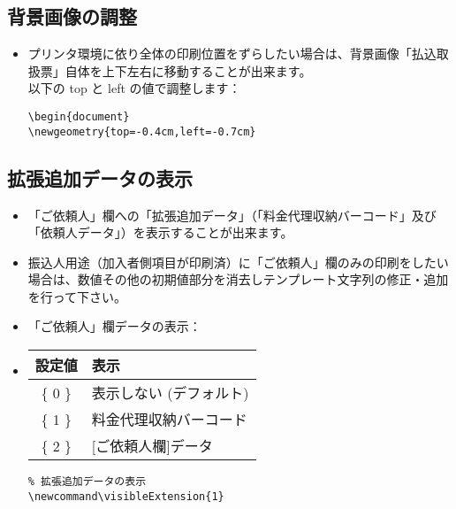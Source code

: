 \documentclass[a4paper,10pt,titlepage]{ltjsarticle}
\def\colH#1{\color[HTML]{#1}}
\newcommand\visibleExtension{1}
\begin{document}
\subsection{背景画像の調整}
\begin{itemize}
  \item プリンタ環境に依り全体の印刷位置をずらしたい場合は、背景画像「払込取扱票」自体を上下左右に移動することが出来ます。\\
以下の {\colH{800000} top} と {\colH{800000} left} の値で調整します：
\begin{verbatim}
\begin{document}
\newgeometry{top=-0.4cm,left=-0.7cm}
\end{verbatim}
  
\end{itemize}

\subsection{拡張追加データの表示}

\begin{itemize}
   \item 「ご依頼人」欄への「拡張追加データ」（「料金代理収納バーコード」及び「依頼人データ」）を表示することが出来ます。   
   \item 振込人用途（加入者側項目が印刷済）に「ご依頼人」欄のみの印刷をしたい場合は、数値その他の初期値部分を消去しテンプレート文字列の修正・追加を行って下さい。
   \item 「ご依頼人」欄データの表示：
   \item[] 
\vspace{2mm}
\begin{tabular}{|c|l|}
\hline
\bfseries{設定値} & \hspace{40pt}\bfseries{表示}\\
\hline
\{ 0 \} & 表示しない (デフォルト)\\
\hline
\{ 1 \} & 料金代理収納バーコード\\
\hline
\{ 2 \} & [ご依頼人欄]データ\\
\hline
\end{tabular}
\vspace{2mm}
              
\begin{verbatim}
% 拡張追加データの表示
\newcommand\visibleExtension{1}
\end{verbatim}

\end{itemize}
\end{document}
